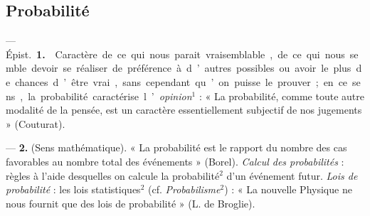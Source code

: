 \subsection{Probabilité}
 — \si{Épist.} {\bf 1.}  Caractère de ce qui
nous parait vraisemblable, de ce qui nous semble devoir se réaliser de
préférence à d’autres possibles ou avoir le plus de chances d’être vrai,
sans cependant qu’on puisse le prouver ; en ce sens, la probabilité
caractérise l’{\it opinion}$^1$ : « La probabilité, comme toute autre
modalité de la pensée, est un caractère essentiellement subjectif de nos
jugements » (Couturat).

 — {\bf 2.}  (Sens mathématique). « La
probabilité est le rapport du nombre des
cas favorables au nombre total des événements » (Borel). {\it Calcul des
probabilités} : règles à l'aide desquelles on calcule la probabilité$^2$
d’un événement futur. {\it Lois de probabilité} : les lois statistiques$^2$
(cf. {\it Probabilisme}$^2$) : « La nouvelle Physique ne nous fournit que
des lois de probabilité » (L. de Broglie).

